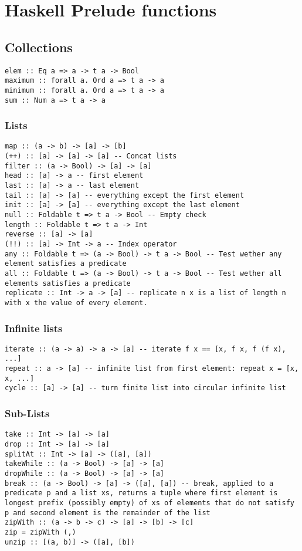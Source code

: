 \appendix\section{Haskell Prelude functions}
\subsection{Collections}
\begin{verbatim}
elem :: Eq a => a -> t a -> Bool 
maximum :: forall a. Ord a => t a -> a
minimum :: forall a. Ord a => t a -> a
sum :: Num a => t a -> a
\end{verbatim}
\subsubsection{Lists}
\begin{verbatim}
map :: (a -> b) -> [a] -> [b]
(++) :: [a] -> [a] -> [a] -- Concat lists
filter :: (a -> Bool) -> [a] -> [a]
head :: [a] -> a -- first element
last :: [a] -> a -- last element
tail :: [a] -> [a] -- everything except the first element
init :: [a] -> [a] -- everything except the last element
null :: Foldable t => t a -> Bool -- Empty check
length :: Foldable t => t a -> Int
reverse :: [a] -> [a]
(!!) :: [a] -> Int -> a -- Index operator
any :: Foldable t => (a -> Bool) -> t a -> Bool -- Test wether any element satisfies a predicate
all :: Foldable t => (a -> Bool) -> t a -> Bool -- Test wether all elements satisfies a predicate
replicate :: Int -> a -> [a] -- replicate n x is a list of length n with x the value of every element.
\end{verbatim}
\subsubsection{Infinite lists}
\begin{verbatim}
iterate :: (a -> a) -> a -> [a] -- iterate f x == [x, f x, f (f x), ...]
repeat :: a -> [a] -- infinite list from first element: repeat x = [x, x, ...]
cycle :: [a] -> [a] -- turn finite list into circular infinite list
\end{verbatim}
\subsubsection{Sub-Lists}
\begin{verbatim}
take :: Int -> [a] -> [a]
drop :: Int -> [a] -> [a]
splitAt :: Int -> [a] -> ([a], [a])
takeWhile :: (a -> Bool) -> [a] -> [a]
dropWhile :: (a -> Bool) -> [a] -> [a] 
break :: (a -> Bool) -> [a] -> ([a], [a]) -- break, applied to a predicate p and a list xs, returns a tuple where first element is longest prefix (possibly empty) of xs of elements that do not satisfy p and second element is the remainder of the list
zipWith :: (a -> b -> c) -> [a] -> [b] -> [c]
zip = zipWith (,)
unzip :: [(a, b)] -> ([a], [b])
\end{verbatim}

